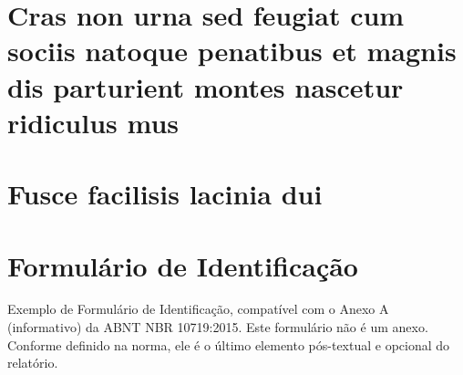 \documentclass[
  12pt,				%
  openright,			%
  twoside,			%
  a4paper,			%
  english,			%
  french,				%
  spanish,			%
  brazil,				%
  ]{abntex2}
\begin{document}
\begin{anexosenv}


  \chapter{Cras non urna sed feugiat cum sociis natoque penatibus et magnis dis
    parturient montes nascetur ridiculus mus}

  \lipsum[31]

  \chapter{Fusce facilisis lacinia dui}

  \lipsum[32]

\end{anexosenv}



\printindex

\chapter*[Formulário de Identificação]{Formulário de Identificação}
\label{formulado-identificacao}

Exemplo de Formulário de Identificação, compatível com o Anexo A (informativo)
da ABNT NBR 10719:2015. Este formulário não é um anexo. Conforme definido na
norma, ele é o último elemento pós-textual e opcional do relatório.

\bigskip
\end{document}
